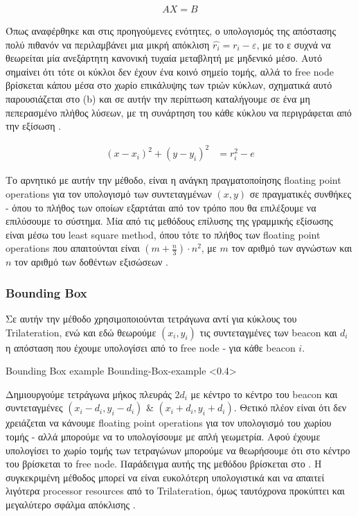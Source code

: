\begin{align}
	AX = B \label{eq:trilateration-linear-system}
\end{align}

Όπως αναφέρθηκε και στις προηγούμενες ενότητες, ο υπολογισμός της απόστασης πολύ πιθανόν να περιλαμβάνει μια μικρή απόκλιση $\widehat{r_i} = r_i - ε$, 
με το ε συχνά να θεωρείται μία ανεξάρτητη κανονική τυχαία μεταβλητή με μηδενικό μέσο. Αυτό σημαίνει ότι
τότε οι κύκλοι δεν έχουν ένα κοινό σημείο τομής, αλλά το free node βρίσκεται κάπου μέσα στο χωρίο επικάλυψης
των τριών κύκλων, σχηματικά αυτό παρουσιάζεται στο  (b) και σε αυτήν την περίπτωση καταλήγουμε σε ένα
μη πεπερασμένο πλήθος λύσεων, με τη συνάρτηση του κάθε κύκλου να περιγράφεται από την εξίσωση
 \cite{wsn-Localization-systems}.

\begin{align}
	(x-x_i)^2 + (y-y_i)^2 &= r_i^2-e \label{eq:trilateration-circles-error}
\end{align}

Το αρνητικό με αυτήν την μέθοδο, είναι η ανάγκη πραγματοποίησης floating point operations για τον υπολογισμό των συντεταγμένων $(x,y)$ σε πραγματικές συνθήκες - όπου το πλήθος
των οποίων εξαρτάται από τον τρόπο που θα επιλέξουμε να επιλύσουμε το σύστημα. 
Μία από τις μεθόδους επίλυσης της γραμμικής εξίσωσης είναι μέσω του least square method, όπου τότε το πλήθος των floating point operations
που απαιτούνται είναι $(m+\frac{n}{3})\cdot n^2$, με $m$ τον αριθμό των αγνώστων και $n$ τον αριθμό των δοθέντων εξισώσεων \cite{wsn-Localization-systems}.

\subsubsection{Bounding Box}
Σε αυτήν την μέθοδο χρησιμοποιούνται τετράγωνα αντί για κύκλους του Tri\-la\-te\-ra\-tion, ενώ και εδώ θεωρούμε $(x_i,y_i)$
τις συντεταγμένες των beacon και $d_i$ η από\-στα\-ση που έχουμε υπολογίσει από το free node - για κάθε beacon $i$. 

%
{Bounding Box example}%
{Bounding-Box-example}%
<0.4>

Δημιουργούμε
τετράγωνα μήκος πλευράς $2d_i$ με κέντρο το κέντρο του beacon και συντεταγμένες $(x_i - d_i, y_i - d_i)$ \& $(x_i + d_i, y_i + d_i)$. 
Θετικό πλέον είναι ότι δεν χρειάζεται να κάνουμε floating point operations για τον υπολογισμό του χωρίου τομής - αλλά μπορούμε να το υπολογίσουμε
με απλή γεωμετρία. Αφού έχουμε υπολογίσει το χωρίο τομής των τετραγώνων μπορούμε να θεωρήσουμε ότι στο κέντρο του βρίσκεται το free node.
Παράδειγμα αυτής της μεθόδου βρίσκεται στο .
Η συγκεκριμένη μέθοδος μπορεί να είναι ευκολότερη υπολογιστικά και να απαιτεί λιγότερα processor resources από το Trilateration, όμως ταυτόχρονα 
προκύπτει και μεγαλύτερο σφάλμα απόκλισης \cite{wsn-Localization-systems}.   



